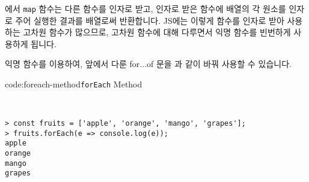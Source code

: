 에서 \verb|map| 함수는 다른 함수를 인자로 받고, 인자로 받은 함수에 배열의 각 원소를 인자로 주어 실행한 결과를 배열로써 반환합니다. JS에는 이렇게 함수를 인자로 받아 사용하는 고차원 함수가 많으므로, 고차원 함수에 대해 다루면서 익명 함수를 빈번하게 사용하게 됩니다. 

익명 함수를 이용하여, 앞에서 다룬 for...of 문을 과 같이 바꿔 사용할 수 있습니다. 

\begin{codeenv}{code:foreach-method}{\texttt{forEach} Method}\begin{verbatim}


> const fruits = ['apple', 'orange', 'mango', 'grapes'];
> fruits.forEach(e => console.log(e));
apple
orange
mango
grapes
\end{verbatim}
\end{codeenv}
